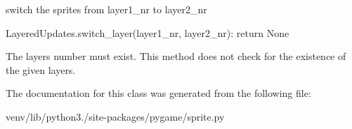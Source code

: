 \begin{DoxyVerb}switch the sprites from layer1_nr to layer2_nr

LayeredUpdates.switch_layer(layer1_nr, layer2_nr): return None

The layers number must exist. This method does not check for the
existence of the given layers.\end{DoxyVerb}
 

The documentation for this class was generated from the following file\+:\begin{DoxyCompactItemize}
\item 
venv/lib/python3./site-\/packages/pygame/sprite.\+py\end{DoxyCompactItemize}
